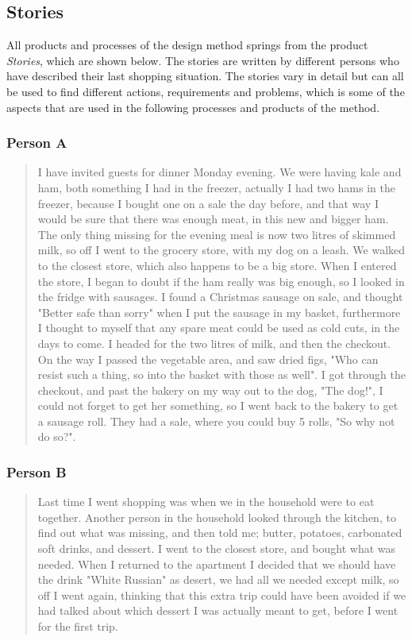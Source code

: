 \subsection{Stories} \label{UserStories}
All products and processes of the design method springs from the product \textit{Stories}, which are shown below. The stories are written by different persons who have described their last shopping situation.
The stories vary in detail but can all be used to find different actions, requirements and problems, which is some of the aspects that are used in the following processes and products of the method.

\subsubsection{Person A}
\begin{quote}
I have invited guests for dinner Monday evening. We were having kale and ham, both something I had in the freezer, actually I had two hams in the freezer, because I bought one on a sale the day before, and that way I would be sure that there was enough meat, in this new and bigger ham. The only thing missing for the evening meal is now two litres of skimmed milk, so off I went to the grocery store, with my dog  on a leash. We walked to the closest store, which also happens to be a big store. When I entered the store, I began to doubt if the ham really was big enough, so I looked in the fridge with sausages.
I found a Christmas sausage on sale, and thought "Better safe than sorry" when I put the sausage in my basket, furthermore I thought to myself that any spare meat could be used as cold cuts, in the days to come. I headed for the two litres of milk, and then the checkout. On the way I passed the vegetable area, and saw dried figs, "Who can resist such a thing, so into the basket with those as well". I got through the checkout, and past the bakery on my way out to the dog, "The dog!", I could not forget to get her something, so I went back to the bakery to get a sausage roll. They had a sale, where you could buy 5 rolls, "So why not do so?".
\end{quote}

\subsubsection{Person B}
\begin{quote}
Last time I went shopping was when we in the household were to eat together. Another person in the household looked through the kitchen, to find out what was missing, and then told me; butter, potatoes, carbonated soft drinks, and dessert. I went to the closest store, and bought what was needed. When I returned to the apartment I decided that we should have the drink "White Russian" as desert, we had all we needed except milk, so off I went again, thinking that this extra trip could have been avoided if we had talked about which dessert I was actually meant to get, before I went for the first trip.
\end{quote}
 
